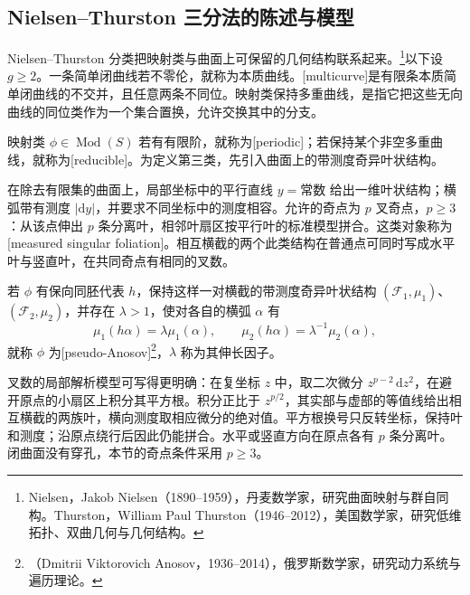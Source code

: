 \subsection{Nielsen–Thurston 三分法的陈述与模型}
\label{g4:subsec:0601:07}

Nielsen--Thurston 分类把映射类与曲面上可保留的几何结构联系起来。\footnote{Nielsen，Jakob Nielsen（1890--1959），丹麦数学家，研究曲面映射与群自同构。Thurston，William Paul Thurston（1946--2012），美国数学家，研究低维拓扑、双曲几何与几何结构。}以下设 \(g\ge2\)。一条简单闭曲线若不零伦，就称为本质曲线。[multicurve]是有限条本质简单闭曲线的不交并，且任意两条不同位。映射类保持多重曲线，是指它把这些无向曲线的同位类作为一个集合置换，允许交换其中的分支。

\begin{definition}\label{g4:def:0601:nt-types}
	映射类 \(\phi\in\operatorname{Mod}(S)\) 若有有限阶，就称为[periodic]；若保持某个非空多重曲线，就称为[reducible]。为定义第三类，先引入曲面上的带测度奇异叶状结构。

	在除去有限集的曲面上，局部坐标中的平行直线 \(y=\text{常数}\) 给出一维叶状结构；横弧带有测度 \(|\mathrm{d}y|\)，并要求不同坐标中的测度相容。允许的奇点为 \(p\) 叉奇点，\(p\ge3\)：从该点伸出 \(p\) 条分离叶，相邻叶扇区按平行叶的标准模型拼合。这类对象称为[measured singular foliation]。相互横截的两个此类结构在普通点可同时写成水平叶与竖直叶，在共同奇点有相同的叉数。

	若 \(\phi\) 有保向同胚代表 \(h\)，保持这样一对横截的带测度奇异叶状结构 \((\mathcal F_1,\mu_1)\)、\((\mathcal F_2,\mu_2)\)，并存在 \(\lambda>1\)，使对各自的横弧 \(\alpha\) 有
	\begin{equation}\label{g4:eq:0601:pseudo-anosov-measure}
		\mu_1(h\alpha)=\lambda\mu_1(\alpha),\qquad
		\mu_2(h\alpha)=\lambda^{-1}\mu_2(\alpha),
	\end{equation}
	就称 \(\phi\) 为[pseudo-Anosov]\footnote{（Dmitrii Viktorovich Anosov，1936--2014），俄罗斯数学家，研究动力系统与遍历理论。}，\(\lambda\) 称为其伸长因子。
\end{definition}

叉数的局部解析模型可写得更明确：在复坐标 \(z\) 中，取二次微分 \(z^{p-2}\,\mathrm{d}z^2\)，在避开原点的小扇区上积分其平方根。积分正比于 \(z^{p/2}\)，其实部与虚部的等值线给出相互横截的两族叶，横向测度取相应微分的绝对值。平方根换号只反转坐标，保持叶和测度；沿原点绕行后因此仍能拼合。水平或竖直方向在原点各有 \(p\) 条分离叶。闭曲面没有穿孔，本节的奇点条件采用 \(p\ge3\)。

